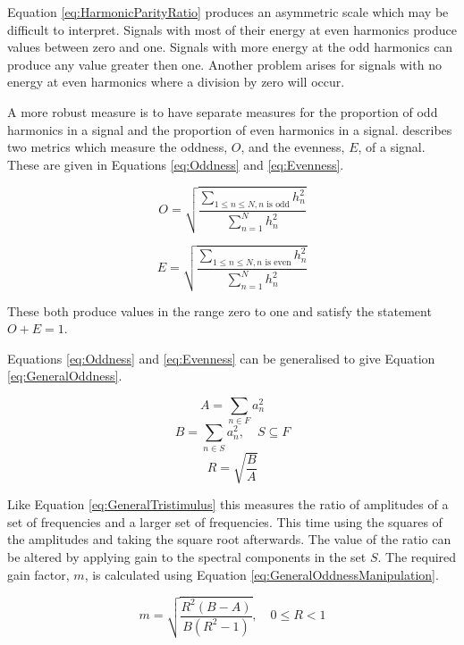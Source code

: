 		Equation \ref{eq:HarmonicParityRatio} produces an asymmetric scale which may be difficult to interpret.
		Signals with most of their energy at even harmonics produce values between zero and one. Signals with more
		energy at the odd harmonics can produce any value greater then one. Another problem arises for signals with
		no energy at even harmonics where a division by zero will occur.

		A more robust measure is to have separate measures for the proportion of odd harmonics in a signal and the
		proportion of even harmonics in a signal.  \citet{lukasik2005towards} describes two metrics which measure
		the oddness, $O$, and the evenness, $E$, of a signal. These are given in Equations \ref{eq:Oddness} and
		\ref{eq:Evenness}.

		\begin{equation}
			O = \sqrt{\frac{\sum_{1 \leq n \leq N, n \textrm{ is odd}} h_{n}^{2}}
			               {\sum_{n = 1}^{N} h_{n}^{2}}}
			\label{eq:Oddness}
		\end{equation}

		\begin{equation}
			E = \sqrt{\frac{\sum_{1 \leq n \leq N, n \textrm{ is even}} h_{n}^{2}}
			               {\sum_{n = 1}^{N} h_{n}^{2}}}
			\label{eq:Evenness}
		\end{equation}

		These both produce values in the range zero to one and satisfy the statement $O + E = 1$. 

		Equations \ref{eq:Oddness} and \ref{eq:Evenness} can be generalised to give Equation
		\ref{eq:GeneralOddness}.

		\[ A = \sum_{n \in F} a_{n}^{2} \]
		\[ B = \sum_{n \in S} a_{n}^{2}, \quad S \subseteq F \]
		\begin{equation}
			R = \sqrt{\frac{B}{A}}
			\label{eq:GeneralOddness}
		\end{equation}

		Like Equation \ref{eq:GeneralTristimulus} this measures the ratio of amplitudes of a set of frequencies and
		a larger set of frequencies. This time using the squares of the amplitudes and taking the square root
		afterwards. The value of the ratio can be altered by applying gain to the spectral components in the set
		$S$. The required gain factor, $m$, is calculated using Equation \ref{eq:GeneralOddnessManipulation}.

		\begin{equation}
			m = \sqrt{\frac{R^{2}(B - A)}{B(R^{2} - 1)}}, \quad 0 \leq R < 1
			\label{eq:GeneralOddnessManipulation}
		\end{equation}


